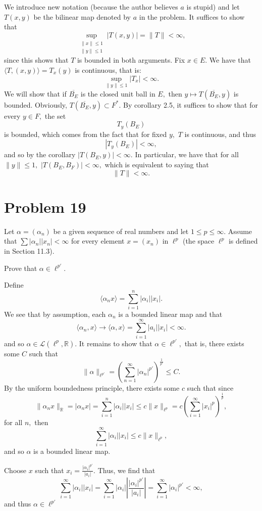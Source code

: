 \documentclass[11pt]{article}
\newcommand{\bbR}{\mathbb{R}}
\begin{document}
\begin{solution}
    We introduce new notation (because the author believes $a$ is stupid) and let $T(x,y)$ be the bilinear map denoted by $a$ in the problem. It suffices to show that 
    \[\sup_{\substack{\|x\|\leq 1\\\|y\|\leq 1}}|T(x,y)| = \|T\| < \infty,\] since this shows that $T$ is bounded in both arguments. Fix $x\in E.$ We have that $\langle T, (x,y) \rangle  = T_x(y)$ is continuous, that is:
    \[\sup_{\|y\|\leq 1} |T_x| < \infty.\] We will show that if $\overline{B_E}$ is the closed unit ball in $E,$ then $y \mapsto T(\overline{B_E}, y)$ is bounded. Obviously, $T(\overline{B_E}, y)\subset F^*.$ By corollary 2.5, it suffices to show that for every $y\in F,$ the set 
    \[T_y(B_E)\] is bounded, which comes from the fact that for fixed $y,$ $T$ is continuous, and thus 
    \[|T_y(B_E)|< \infty,\] and so by the corollary $|T(B_E, y)|< \infty.$ In particular, we have that for all $\|y\|\leq 1,$ $|T(B_E, B_F)|< \infty,$ which is equivalent to saying that 
    \[\|T\| < \infty.\]
\end{solution}

\newpage
\section*{Problem 19}

\begin{problem}

{ Let } $\alpha = (\alpha_n)$ { be a given sequence of real numbers and let } $1 \leq p \leq \infty.$ { Assume that } $\sum |\alpha_n||x_n| < \infty$ { for every element } $x = (x_n)$ { in } $\ell^p$ { (the space } $\ell^p$ { is defined in Section 11.3).}

{Prove that } $\alpha \in \ell^{p'}.$
\end{problem}
\begin{solution}
    Define 
    \[\langle \alpha_n x \rangle = \sum_{i=1}^n |\alpha_i| |x_i|.\] We see that by assumption, each $\alpha_n$ is a bounded linear map and that 
    \[\langle \alpha_n, x\rangle \to \langle \alpha, x\rangle = \sum_{i=1}^\infty|a_i||x_i| < \infty.\] and so $\alpha \in \mathcal{L}(\ell^p, \bbR).$ It remains to show that $\alpha \in \ell^{p'},$ that is, there exists some $C$ such that
    \[\|\alpha\|_{\ell^{p'}}  = \left(\sum_{n=1}^\infty |\alpha_n|^{p'}\right)^\frac{1}{p'} \leq C.\] By the uniform boundedness principle, there exists some $c$ such that since
    \[\|\alpha_n x\|_\bbR = |\alpha_n x|  = \sum_{i=1}^n |\alpha_i||x_i|\leq c \|x\|_{\ell^p} = c\left(\sum_{i=1}^\infty |x_i|^p\right)^\frac{1}{p},\] for all $n,$ then 
    \[\sum_{i=1}^\infty |\alpha_i||x_i| \leq c \|x\|_{\ell^p},\] and so $\alpha$ is a bounded linear map.   

    Choose $x$ such that $x_i = \frac{|\alpha_i|^{p'}}{|a_i|}.$ Thus, we find that 
    \[\sum_{i=1}^\infty |\alpha_i||x_i| = \sum_{i=1}^\infty |\alpha_i||\frac{|\alpha_i|^{p'}}{|a_i|}| = \sum_{i=1}^\infty |\alpha_i|^{p'} < \infty,\] and thus $\alpha \in \ell^{p'}$ 

\end{solution}
\end{document}
